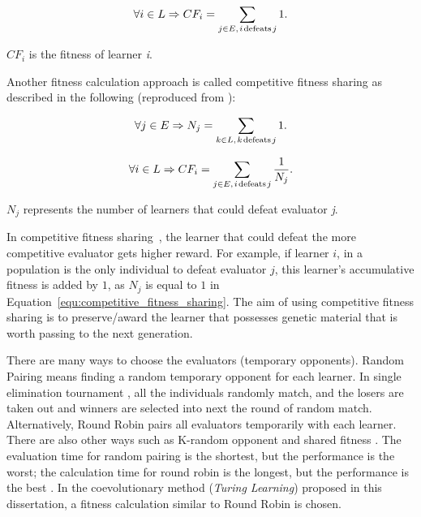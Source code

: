 \begin{equation}\label{equ:simple_fitness_calculation}
\forall i \in L \Rightarrow C{F_i} = \sum\limits_{j \in E,{\kern 1pt} i{\kern 1pt} \text{defeats} {\kern 1pt} j} 1.
\end{equation}

$C{F_i}$ is the fitness of learner \textit{i}. 

Another fitness calculation approach is called competitive fitness sharing \cite{Rosin_1997} as described in the following (reproduced from \cite{BiLi2009}):

\begin{equation}
\forall j \in E \Rightarrow {N_j} = \sum\limits_{k \in L,{\kern 1pt} k{\kern 1pt} \text{defeats} {\kern 1pt} j} 1.
\end{equation}

\begin{equation}\label{equ:competitive_fitness_sharing}
\forall i \in L \Rightarrow C{F_i} = \sum\limits_{j \in E,{\kern 1pt} i{\kern 1pt} \text{defeats} {\kern 1pt} j} {\frac{1}{{{N_j}}}}.
\end{equation}

${N_j}$ represents the number of learners that could defeat evaluator \textit{j}.  

In competitive fitness sharing~\cite{Rosin_1997}, the learner that could defeat the more competitive evaluator gets higher reward. For example, if learner $i$, in a population is the only individual to defeat evaluator $j$, this learner's accumulative fitness is added by $1$, as $N_j$ is equal to $1$ in Equation~\eqref{equ:competitive_fitness_sharing}. The aim of using competitive fitness sharing is to preserve/award the learner that possesses genetic material that is worth passing to the next generation. 

There are many ways to choose the evaluators (temporary opponents). Random Pairing \cite{Panait_2002} means finding a random temporary opponent for each learner. In single elimination tournament \cite{Tan_2007}, all the individuals randomly match, and the losers are taken out and winners are selected into next the round of random match. Alternatively, Round Robin \cite{Panait_2002} pairs all evaluators temporarily with each learner. There are also other ways such as K-random opponent \cite{Tan_2007} and shared fitness \cite{Rosin_1997}. The evaluation time for random pairing is the shortest, but the performance is the worst; the calculation time for round robin is the longest, but the performance is the best \cite{BiLi2009}. In the coevolutionary method (\textit{Turing Learning}) proposed in this dissertation, a fitness calculation similar to Round Robin is chosen.

